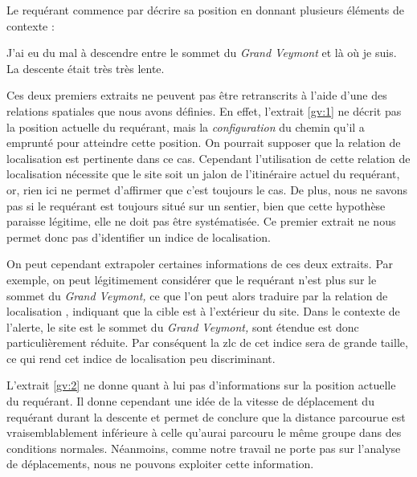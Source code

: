 Le requérant commence par décrire sa position en donnant plusieurs
éléments de contexte :
%
\begin{dialogue*}
  \Req {} J'ai eu du mal à descendre entre le sommet du
  \emph{Grand Veymont} et là où je suis.  La descente
  était très très lente.
\end{dialogue*}
%
Ces deux premiers extraits ne peuvent pas être retranscrits à l'aide
d'une des relations spatiales que nous avons définies. En effet,
l'extrait \ref{gv:1} ne décrit pas la position actuelle du requérant,
mais la \emph{configuration} du chemin qu'il a emprunté pour atteindre
cette position. On pourrait supposer que la relation de localisation
 est pertinente dans ce
cas. Cependant l'utilisation de cette relation de localisation
nécessite que le site soit un jalon de l’itinéraire actuel du
requérant, or, rien ici ne permet d'affirmer que c'est toujours le
cas. De plus, nous ne savons pas si le requérant est toujours situé
sur un sentier, bien que cette hypothèse paraisse légitime, elle ne
doit pas être systématisée. Ce premier extrait ne nous permet donc pas
d'identifier un indice de localisation.

On peut cependant extrapoler certaines informations de ces deux
extraits. Par exemple, on peut légitimement considérer que le
requérant n'est plus sur le sommet du \emph{Grand Veymont,} ce que
l'on peut alors traduire par la relation de localisation
, indiquant que la cible est à
l'extérieur du site. Dans le contexte de l'alerte, le site est le
sommet du \emph{Grand Veymont,} sont étendue est donc particulièrement
réduite. Par conséquent la \ac{zlc} de cet indice sera de grande
taille, ce qui rend cet indice de localisation peu discriminant.

L'extrait \ref{gv:2} ne donne quant à lui pas d'informations sur la
position actuelle du requérant. Il donne cependant une idée de la
vitesse de déplacement du requérant durant la descente et permet de
conclure que la distance parcourue est vraisemblablement inférieure à
celle qu'aurai parcouru le même groupe dans des conditions
normales. Néanmoins, comme notre travail ne porte pas sur l'analyse de
déplacements, nous ne pouvons exploiter cette information.

